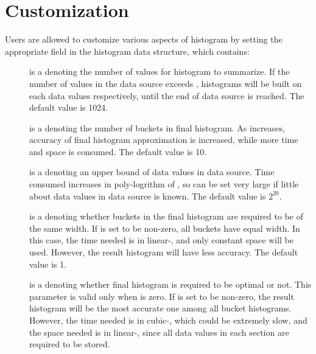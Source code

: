 \section{Customization}
\label{sec:accumulators-customization}
Users are allowed to customize various aspects of histogram by 
setting the appropriate field in the histogram data structure, 
which contains: 

\begin{description}
\item[] is a  denoting the number of values
  for histogram to summarize. If the number of values in the data
  source exceeds , histograms will be built on each
   data values respectively, until the end of data
  source is reached. The default value is 1024.

\item[] is a  denoting the number of buckets
  in final histogram. As  increases, accuracy of final
  histogram approximation is increased, while more time and space is
  consumed. The default value is 10.

\item[] is a  denoting an upper bound of data
  values in data source. Time consumed increases in poly-logrithm of
  , so  can be set very large if little about
  data values in data source is known. The default value is $2^{20}$.

\item[] is a  denoting whether buckets in the final
  histogram are required to be of the same width. If  is
  set to be non-zero, all buckets have equal width. In this case,
  the time needed is in linear-, and only constant space will
  be used. However, the result histogram will have less accuracy. The
  default value is 1.

\item[] is a  denoting whether final histogram
  is required to be optimal or not. This parameter is valid only
  when  is zero. If  is set to be
  non-zero, the result histogram will be the most accurate one among
  all  bucket histograms. However, the time needed is in
  cubic-, which could be extremely slow, and the space
  needed is in linear-, since all data values in each
   section are required to be stored.


\end{description}
